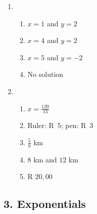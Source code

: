 {\begin{multicols}{3}
\begin{enumerate}[noitemsep, label=\textbf{\arabic*}. ]
\item %
\begin{enumerate}[noitemsep,label=\textbf{(\alph*)}]
\item $x=1$ and $y=2$%
\item $x=4$ and $y=2$%
\item $x=5$ and $y=-2$%
\item No solution%
\end{enumerate}

\item %
\begin{enumerate}[noitemsep,label=\textbf{(\alph*)}]
\item $x=\frac{120}{13}$%
\item Ruler: R~$5$; pen: R~$3$%
\item $\frac{5}{9}$ km%
\item $8$ km and $12$ km%
\item R $20,00$%
   

\end{enumerate}
\end{enumerate}

\end{multicols}

\subsection*{3. Exponentials}
\begin{multicols}{3}

\end{multicols}}

